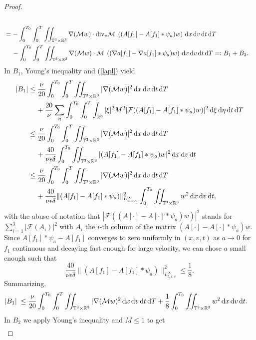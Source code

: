 \documentclass[11pt,american, reqno]{amsart}
\numberwithin{equation}{section}
\newcommand{\R}{\mathbb R}
\newcommand{\1}{\mathds{1}}
\newcommand{\dt}{\, {\rm d} t}
\newcommand{\dT}{\, {\rm d} T}
\newcommand{\dv}{\, {\rm d} v}
\newcommand{\dx}{\, {\rm d} x}
\newcommand{\dxi}{\, {\rm d} \xi}
\newcommand{\deta}{\, {\rm d} \eta}
\newcommand{\Eps}{\epsilon}
\newcommand{\T}{\mathbb{T}}
\numberwithin{equation}{section}
\begin{document}
\begin{proof}
\begin{align*}
\\
&= - \int_0^{T_0}\int_0^{T} \iint_{\T^3 \times \R^3}  \nabla (\mathcal{M} w) \cdot \textrm{div}_v \mathcal{M} \;\left( (A[f_1]-A[f_1]\ast \psi_a)  w \right) \dx\dv\dt\dT
\\
& \quad \,
- \int_0^{T_0}\int_0^{T} \iint_{\T^3 \times \R^3}  \nabla (\mathcal{M} w) \cdot \mathcal{M} \;\left( (\nabla a[f_1]-\nabla a[f_1]\ast \psi_a)  w \right)\dx\dv\dt\dT =: B_1+B_2.
\end{align*}
In $B_1$, Young's inequality and (\ref{lapl}) yield
\begin{align*}
    |B_1| 
& \leq   
 \frac{\nu}{20} \int_0^{T_0}\int_0^{T} \iint_{\T^3 \times \R^3}  |\nabla(\mathcal{M} w)|^2 \dx\dv\dt\dT 
\\
& \quad \, 
    + \frac{20}{\nu} \sum_\eta \int_0^{T_0}\int_0^{T} \int_{\R^3}  |\xi|^2 M^2 |  \mathcal{F}({(A[f_1]- A[f_1]\ast \psi_a) w})|^2  \dxi \deta \dt\dT 
\\
& \leq  
   \frac{\nu}{20} \int_0^{T_0}\int_0^{T} \iint_{\T^3 \times \R^3}  |\nabla(\mathcal{M} w)|^2 \dx\dv\dt\dT 
\\
    & \quad \,
    +  \frac{40}{\nu \Eps \delta} \int_0^{T_0} \iint_{\T^3 \times \R^3}  |  (A[f_1]- A[f_1]\ast \psi_a) w|^2  \dx \dv \dt
\\
& \leq  
\frac{\nu}{20} \int_0^{T_0}\int_0^{T} \iint_{\T^3 \times \R^3}  |\nabla(\mathcal{M} w)|^2 \dx\dv\dt\dT 
\\
& \quad \, 
+  \frac{40}{\nu \Eps \delta}\|  (A[f_1]- A[f_1]\ast \psi_a)\|_{L^{\infty}_{t,x,v}}^2 \int_0^{T_0} \iint_{\T^3 \times \R^3}  w^2  \dx \dv \dt ,
\end{align*}
with the abuse of notation that $|  \mathcal{F}({(A[\cdot]- A[\cdot]\ast \psi_a) w})|^2$ stands for $\sum_{i=1}^3 |\mathcal{F}(A_i)|^2$ with $A_i$ the $i$-th column of the matrix $(A[\cdot]- A[\cdot]\ast \psi_a)w$.  Since $A[f_1]\ast \psi_a-A[f_1]$ converges to zero uniformly  in $(x,v,t)$  as $a \to 0$ for $f_1$ continuous and decaying fast enough for large velocity, we can chose  $a$ small enough such that 
$$
 \frac{40}{\nu \Eps \delta} \|  (A[f_1]- A[f_1]\ast \psi_a)\|_{L^{\infty}_{t,x,v}}^2 \le  \frac{1}{8}. 
$$
 Summarizing, 
 \begin{align*}
    |B_1|  \; \le \; &    \frac{\nu}{20} \int_0^{T_0}\int_0^{T} \iint_{\T^3 \times \R^3}  |\nabla(\mathcal{M} w)^2 \dx\dv\dt\dT  + \frac{1}{8} \int_0^{T_0} \iint_{\T^3 \times \R^3}  w^2  \dx \dv \dt.
 \end{align*}
In $B_2$ we apply Young's inequality and ${M}\le 1$ to get 
\begin{align*}

\end{align*}
\end{proof}
\end{document}
